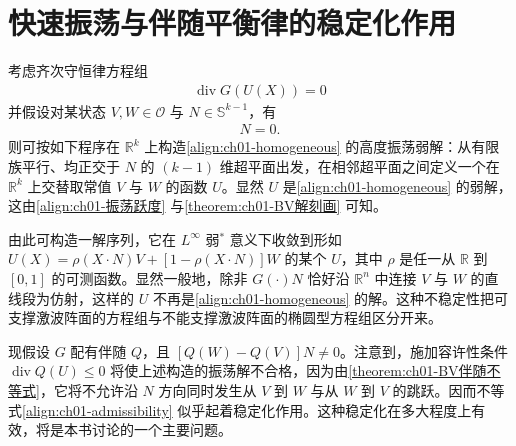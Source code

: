\documentclass[../../main.tex]{subfiles}
\begin{document}
\section{快速振荡与伴随平衡律的稳定化作用}\label{section:ch01-快速振荡}

考虑齐次守恒律方程组
\begin{align}
\operatorname{div} G(U(X))=0\label{align:ch01-homogeneous}
\end{align}
并假设对某状态 $V,W\in\mathcal{O}$ 与 $N\in\mathbb{S}^{k-1}$，有
\begin{align}
[G(W)-G(V)]N=0.\label{align:ch01-振荡跃度}
\end{align}
则可按如下程序在 $\mathbb{R}^{k}$ 上构造\cref{align:ch01-homogeneous} 的高度振荡弱解：从有限族平行、均正交于 $N$ 的 $(k-1)$ 维超平面出发，在相邻超平面之间定义一个在 $\mathbb{R}^{k}$ 上交替取常值 $V$ 与 $W$ 的函数 $U$。显然 $U$ 是\cref{align:ch01-homogeneous} 的弱解，这由\cref{align:ch01-振荡跃度} 与\cref{theorem:ch01-BV解刻画} 可知。

由此可构造一解序列，它在 $L^{\infty}$ 弱$^{*}$ 意义下收敛到形如 $U(X)=\rho(X\cdot N)V+[1-\rho(X\cdot N)]W$ 的某个 $U$，其中 $\rho$ 是任一从 $\mathbb{R}$ 到 $[0,1]$ 的可测函数。显然一般地，除非 $G(\cdot)N$ 恰好沿 $\mathbb{R}^{n}$ 中连接 $V$ 与 $W$ 的直线段为仿射，这样的 $U$ 不再是\cref{align:ch01-homogeneous} 的解。这种不稳定性把可支撑激波阵面的方程组与不能支撑激波阵面的椭圆型方程组区分开来。

现假设 $G$ 配有伴随 $Q$，且 $[Q(W)-Q(V)]N\neq 0$。注意到，施加容许性条件 $\operatorname{div}Q(U)\leqslant 0$ 将使上述构造的振荡解不合格，因为由\cref{theorem:ch01-BV伴随不等式}，它将不允许沿 $N$ 方向同时发生从 $V$ 到 $W$ 与从 $W$ 到 $V$ 的跳跃。因而不等式\cref{align:ch01-admissibility} 似乎起着稳定化作用。这种稳定化在多大程度上有效，将是本书讨论的一个主要问题。
\end{document}
